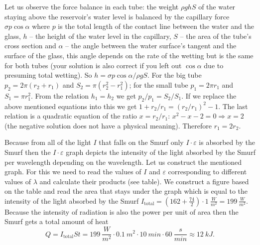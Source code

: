 \documentclass[11pt]{article}
\begin{document}
\solueng
Let us observe the force balance in each tube: the weight $\rho g h S$ of the water staying above the reservoir’s water level is balanced by the capillary force $\sigma p \cos \alpha$ where $p$ is the total length of the contact line between the water and the glass, $h$ – the height of the water level in the capillary, $S$ – the area of the tube’s cross section and $\alpha$ – the angle between the water surface’s tangent and the surface of the glass, this angle depends on the rate of the wetting but is the same for both tubes (your solution is also correct if you left out $\cos\alpha$ due to presuming total wetting). So $h=\sigma p
\cos\alpha/\rho g S$. For the big tube $p_2=2\pi (r_2+r_1)$ and $S_2=\pi(r_2^2-r_1^2)$; for the small tube $p_1=2\pi r_1$ and $S_1=\pi
r_1^2$. From the relation $h_1=h_2$ we get $p_2/p_1=S_2/S_1$. If we replace the above mentioned equations into this we get $1+r_2/r_1=(r_2/r_1)^2-1$. The last relation is a quadratic equation of the ratio $x=r_2/r_1$: $x^2-x-2=0 \Rightarrow x=2$ (the negative solution does not have a physical meaning). Therefore $r_1=2 r_2$.
\probend
\bigskip


\solueng
Because from all of the light $I$ that falls on the Smurf only $ I \cdot \varepsilon $ is absorbed by the Smurf then the $ I \cdot \varepsilon $ graph depicts the intensity of the light absorbed by the Smurf per wavelength depending on the wavelength. Let us construct the mentioned graph. For this we need to read the values of $I$ and $ \varepsilon $ corresponding to different values of $ \lambda $ and calculate their products (see table). We construct a figure based on the table and read the area that stays under the graph which is equal to the intensity of the light absorbed by the Smurf $I_{\mathrm{total}} =
(162+\frac{74}{2}) \cdot \SI{1}{\frac{W}{m^2}} = \SI{199}{\frac{W}{m^2}}$. Because the intensity of radiation is also the power per unit of area then the Smurf gets a total amount of heat
\[ Q = I_{\mathrm{total}}St =
\SI{199}{\frac{W}{m^2}} \cdot \SI{0,1}{m^2} \cdot \SI{10}{min} \cdot
\SI{60}{\frac{s}{min}} \approx \SI{12}{kJ}.\]
\end{document}
